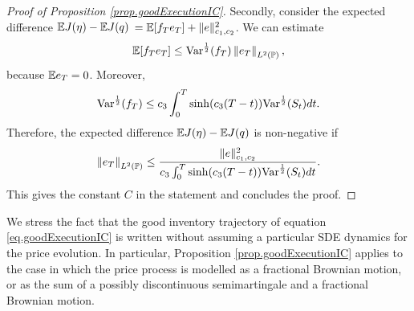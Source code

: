 \documentclass[10pt,a4paper]{article}
\begin{document}
\begin{proof}[Proof of Proposition \ref{prop.goodExecutionIC}]
		Secondly, consider the   expected difference $\Expectation \costFunctional (\eta) - \Expectation \costFunctional (\inventory)$ $=\Expectation[f_\timeHorizon e_\timeHorizon] + \normInventoryTrjectories{e}\squared$. We can estimate
		\begin{equation*}
		\Expectation[f_\timeHorizon e_\timeHorizon] \leq \Variance^{\half}(f_\timeHorizon)\norm[e_\timeHorizon]_{\Ltwo(\Prob)},
		\end{equation*}
		because $\Expectation e_\timeHorizon = 0$. Moreover, 
		\begin{equation*}
		\Variance^{\half}(f_\timeHorizon)
		\leq \ratioAversionOverImpact \intZeroTimeHorizon \sinh(\ratioAversionOverImpact(\timeHorizon - t))\Variance^{\half}(\fundamentalPrice_t) dt. 
		\end{equation*} 
		Therefore, the   expected difference $\Expectation \costFunctional (\eta) - \Expectation \costFunctional (\inventory)$ is non-negative if 
		\begin{equation*}
		\norm[e_\timeHorizon]_{\Ltwo(\Prob)} \leq 
		\frac{ \normInventoryTrjectories{e}\squared }{\ratioAversionOverImpact \intZeroTimeHorizon \sinh(\ratioAversionOverImpact(\timeHorizon - t))\Variance^{\half}(\fundamentalPrice_t) dt}.
		\end{equation*}
		This gives the constant $C$ in the statement and concludes the proof.
	\end{proof}
	
	\begin{remark}
		We stress the fact that the good inventory trajectory of equation \eqref{eq.goodExecutionIC} is written without assuming a particular SDE dynamics for the price evolution. In particular, Proposition \ref{prop.goodExecutionIC} applies to the case in which the price process is modelled as a fractional Brownian motion, or as the sum of a possibly discontinuous semimartingale and a fractional Brownian motion. 
	\end{remark}
\end{document}
